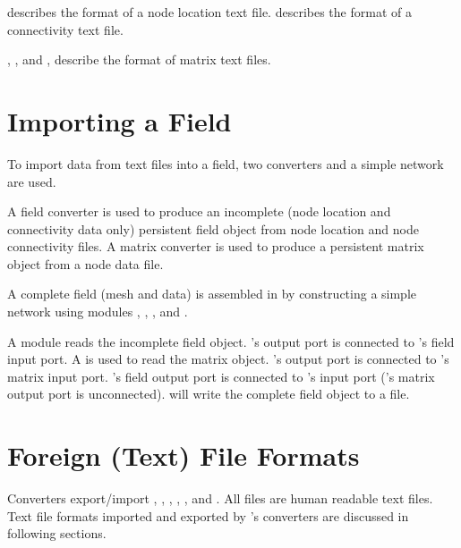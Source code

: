 describes the format of
a node location text file.  
describes the format of a connectivity text file.

, , and , describe the format of matrix text
files.

\section{Importing a Field}
\label{sec:import_field}

To import data from text files into a \sr{} field, two converters and
a simple \sr{} network are used.

A field converter is used to produce an incomplete (node location and
connectivity data only) persistent field object from node location and
node connectivity files.  A matrix converter is used to produce a
persistent matrix object from a node data file.

A complete field (mesh and data) is assembled in \sr{} by constructing
a simple network using modules ,
, , and
.

A  module reads the incomplete field object.
's output port is connected to
's field input port.  A
 is used to read the matrix object.
's output port is connected to
's matrix input port.
's field output port is connected to
's input port ('s
matrix output port is unconnected).   will write
the complete field object to a file.

\section{Foreign (Text) File Formats}

Converters export/import , , , , ,  and .  All files are human readable text files.  Text file formats
imported and exported by \sr{}'s converters are discussed in following
sections.

